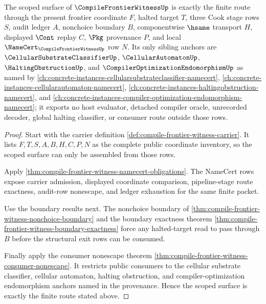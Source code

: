 \begin{theorem}
\label{thm:compile-frontier-witness-scope-closure}
The scoped surface of $\CompileFrontierWitnessUp$ is exactly the finite route through the present frontier coordinate $F$, halted target $T$, three Cook stage rows $S$, audit ledger $A$, nonchoice boundary $B$, componentwise $\hsame$ transport $H$, displayed $\Cont$ replay $C$, $\Pkg$ provenance $P$, and local $\NameCert_{\CompileFrontierWitnessUp}$ row $N$. Its only sibling anchors are $\CellularSubstrateClassifierUp$, $\CellularAutomatonUp$, $\HaltingObstructionUp$, and $\CompilerOptimizationEndomorphismUp$ as named by \autoref{ch:concrete-instances-cellularsubstrateclassifier-namecert}, \autoref{ch:concrete-instances-cellularautomaton-namecert}, \autoref{ch:concrete-instances-haltingobstruction-namecert}, and \autoref{ch:concrete-instances-compiler-optimization-endomorphism-namecert}; it exports no host evaluator, detached compiler oracle, unrecorded decoder, global halting classifier, or consumer route outside those rows.
\end{theorem}
\begin{proof}
Start with the carrier definition \autoref{def:compile-frontier-witness-carrier}. It lists $F,T,S,A,B,H,C,P,N$ as the complete public coordinate inventory, so the scoped surface can only be assembled from those rows.

Apply \autoref{thm:compile-frontier-witness-namecert-obligations}. The NameCert rows expose carrier admission, displayed coordinate comparison, pipeline-stage route exactness, audit-row nonescape, and ledger exhaustion for the same finite packet.

Use the boundary results next. The nonchoice boundary of \autoref{thm:compile-frontier-witness-nonchoice-boundary} and the boundary exactness theorem \autoref{thm:compile-frontier-witness-boundary-exactness} force any halted-target read to pass through $B$ before the structural exit rows can be consumed.

Finally apply the consumer nonescape theorem \autoref{thm:compile-frontier-witness-consumer-nonescape}. It restricts public consumers to the cellular substrate classifier, cellular automaton, halting obstruction, and compiler-optimization endomorphism anchors named in the provenance. Hence the scoped surface is exactly the finite route stated above.
\end{proof}

